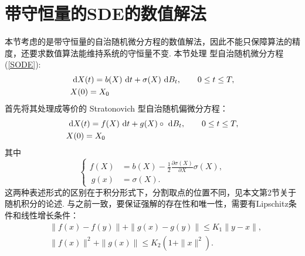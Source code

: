\chapter{带守恒量的SDE的数值解法}\label{chap5}
本节考虑的是带守恒量的自治随机微分方程的数值解法，因此不能只保障算法的精度，还要求数值算法能维持系统的守恒量不变. 本节处理 \ito 型自治随机微分方程(\ref{SODE}):
\begin{equation}\label{eq5.1}
	\begin{aligned} 
	&\text{ d} X(t) = b(X) \text{ d} t + \sigma (X) \text{ d} B_t ,\qquad 0 \le t\le  T,\\
	&X(0) = X_0
	\end{aligned}
\end{equation}
首先将其处理成等价的 Stratonovich 型自治随机偏微分方程：
\begin{equation}\label{eq5.2}
	\begin{aligned} 
	&\text{ d} X(t) = f(X)\text{ d} t + g(X) \circ \text{ d} B_t,\qquad  0 \le t \le T,\\
	&X(0) = X_0
	\end{aligned}
\end{equation}
其中 
\begin{equation}\label{eq5.3}
\left\{
\begin{aligned}
	f(X) &= b(X) - \frac12 \frac{\partial \sigma(X)}{\partial X} \sigma(X),\\\ g(x) &= \sigma(X).
\end{aligned}
\right.
\end{equation}
这两种表述形式的区别在于积分形式下，分割取点的位置不同，见本文第2节关于随机积分的论述. 
与之前一致，要保证强解的存在性和唯一性，需要有Lipschitz条件和线性增长条件：
\begin{equation}\label{eq5.4}
\begin{aligned}
	&\| f(x) - f(y)\| + \|g(x)-g(y)\| \le K_1 \| y-x\|,\\
	&\| f(x)\| ^2 + \| g(x) \| \le K_2 (1+\|x\|^2).
\end{aligned}
\end{equation}



